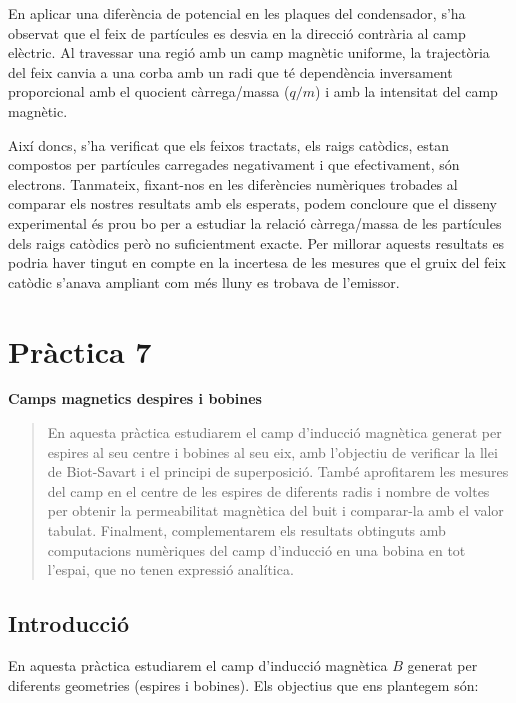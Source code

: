 \documentclass[11pt]{article}
\numberwithin{equation}{section}
\numberwithin{figure}{section}
\numberwithin{table}{section}
\begin{document}
En aplicar una diferència de potencial en les plaques del condensador, s'ha observat que el feix de partícules es desvia en la direcció contrària al camp elèctric. Al travessar una regió amb un camp magnètic uniforme, la trajectòria del feix canvia a una corba amb un radi que té dependència inversament proporcional amb el quocient càrrega/massa ($q/m$) i amb la intensitat del camp magnètic. 

Així doncs, s'ha verificat que els feixos tractats, els raigs catòdics, estan compostos per partícules carregades negativament i que efectivament, són electrons. Tanmateix, fixant-nos en les diferències numèriques trobades al comparar els nostres resultats amb els esperats, podem concloure que el disseny experimental és prou bo per a estudiar la relació càrrega/massa de les partícules dels raigs catòdics però no suficientment exacte. Per millorar aquests resultats es podria haver tingut en compte en la incertesa de les mesures que el gruix del feix catòdic s'anava ampliant com més lluny es trobava de l'emissor. 

\newpage

\section{\huge{\textbf{Pràctica 7}}} \label{sec: pràctica 7}

\vspace{.5em}  %

{\Huge \textbf{Camps magnetics despires i bobines}}  %

\begin{abstract}
En aquesta pràctica estudiarem el camp d'inducció magnètica generat per espires al seu centre i bobines al seu eix, amb l'objectiu de verificar la llei de Biot-Savart i el principi de superposició. També aprofitarem les mesures del camp en el centre de les espires de diferents radis i nombre de voltes per obtenir la permeabilitat magnètica del buit i comparar-la amb el valor tabulat. Finalment, complementarem els resultats obtinguts amb computacions numèriques del camp d'inducció en una bobina en tot l'espai, que no tenen expressió analítica.
\end{abstract}


\subsection{Introducció}\label{sec: intro}

En aquesta pràctica estudiarem el camp d'inducció magnètica $B$ generat per diferents geometries (espires i bobines). Els objectius que ens plantegem són:
\end{document}

